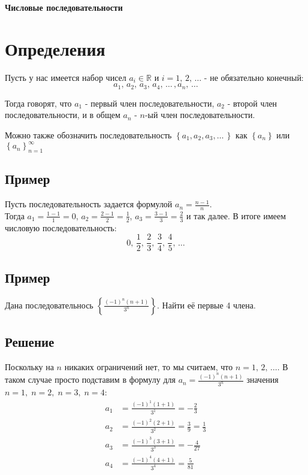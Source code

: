 \documentclass[11pt,a4paper]{article}
\newcommand\RR{{\mathbb R}}
\begin{document}
{\huge \bf{Числовые последовательности}}
\section{Определения}
    Пусть у нас имеется набор чисел $a_{i}\in \RR$ и $i=1,\,2,\,\dots$ - не обязательно конечный:\\ \begin{equation*}
        a_{1},\,a_{2},\,a_{3},\,a_{4},\,\dots\,,a_{n},\,\dots
    \end{equation*}
    
    Тогда говорят, что $a_{1}$ - первый член последовательности, $a_{2}$ - второй член последовательности, и в общем $a_{n}$ - $n$-ый член последовательности.
    
    Можно также обозначить последовательность $\left\{ a_{1},a_{2},a_{3},\dots\,\right\}$ как $\left\{a_{n}\right\}$ или $\left\{ a_{n}\right\} _{n=1}^{\infty}$
\subsection{Пример}
    Пусть последовательность задается формулой $a_{n}=\frac{n-1}{n}$.\\
    Тогда $a_{1}=\frac{1-1}{1}=0$, $a_{2}=\frac{2-1}{2}=\frac{1}{2}$, $a_{3}=\frac{3-1}{3}=\frac{2}{3}$ и так далее. В итоге имеем числовую последовательность:
    \begin{equation*}
        0,\,\frac{1}{2},\,\frac{2}{3},\,\frac{3}{4},\,\frac{4}{5},\,\dots
    \end{equation*}
\subsection{Пример}
    Дана последовательнось $\left\{ \frac{\left(-1\right)^{n}\left(n+1\right)}{3^{n}}\right\}$. Найти её первые 4 члена.
\subsection{Решение}
    Поскольку на $n$ никаких ограничений нет, то мы считаем, что $n=1,\,2,\,\dots$. В таком случае просто подставим в формулу для $a_{n}=\frac{\left(-1\right)^{n}\left(n+1\right)}{3^{n}}$ значения $n=1,\;n=2,\;n=3,\;n=4$:
    \begin{align*}
        a_{1}&=\frac{\left(-1\right)^{1}\left(1+1\right)}{3^{1}}=-\frac{2}{3} \\
        a_{2}&=\frac{\left(-1\right)^{2}\left(2+1\right)}{3^{2}}=\frac{3}{9}=\frac{1}{3}\\
        a_{3}&=\frac{\left(-1\right)^{3}\left(3+1\right)}{3^{3}}=-\frac{4}{27}\\
        a_{4}&=\frac{\left(-1\right)^{4}\left(4+1\right)}{3^{4}}=\frac{5}{81}
    \end{align*}
\end{document}
